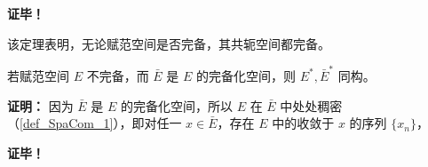 \textbf{证毕！}

该定理表明，无论赋范空间是否完备，其共轭空间都完备。

\begin{theorem}{}
若赋范空间 $E$ 不完备，而 $\bar{E}$ 是 $E$ 的完备化空间，则 $E^*,\bar{E}^*$ 同构。
\end{theorem}

\textbf{证明：} 因为 $\bar{E}$ 是 $E$ 的完备化空间，所以 $E$ 在 $\bar{E}$ 中处处稠密（\autoref{def_SpaCom_1}），即对任一 $x\in \bar{E}$，存在 $E$ 中的收敛于 $x$ 的序列 $\{x_n\}$，


\textbf{证毕！}



